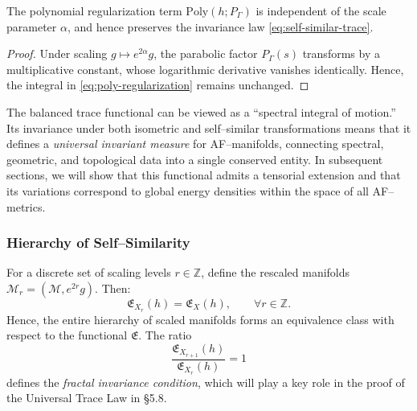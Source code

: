 \begin{lemma}
\label{lem:regularization}
The polynomial regularization term
\(\mathrm{Poly}(h;P_\Gamma)\)
is independent of the scale parameter \(\alpha\),
and hence preserves the invariance law \eqref{eq:self-similar-trace}.
\end{lemma}

\begin{proof}
Under scaling \(g \mapsto e^{2\alpha} g\),
the parabolic factor \(P_\Gamma(s)\)
transforms by a multiplicative constant,
whose logarithmic derivative vanishes identically.
Hence, the integral in \eqref{eq:poly-regularization}
remains unchanged.
\end{proof}


\begin{remark}
The balanced trace functional can be viewed as a “spectral integral of motion.”
Its invariance under both isometric and self–similar transformations
means that it defines a \emph{universal invariant measure}
for AF–manifolds, connecting spectral, geometric,
and topological data into a single conserved entity.
In subsequent sections,
we will show that this functional
admits a tensorial extension
and that its variations correspond to global energy densities
within the space of all AF–metrics.
\end{remark}


\subsubsection*{Hierarchy of Self–Similarity}
For a discrete set of scaling levels \(r\in \mathbb{Z}\),
define the rescaled manifolds \(\mathcal{M}_r = (\mathcal{M}, e^{2r}g)\).
Then:
\begin{equation}
\label{eq:hierarchy-invariance}
\mathfrak{E}_{X_r}(h)
=
\mathfrak{E}_X(h),
\qquad
\forall r\in \mathbb{Z}.
\end{equation}
Hence, the entire hierarchy of scaled manifolds
forms an equivalence class with respect to the functional \(\mathfrak{E}\).
The ratio
\[
\frac{\mathfrak{E}_{X_{r+1}}(h)}{\mathfrak{E}_{X_r}(h)} = 1
\]
defines the \emph{fractal invariance condition},
which will play a key role in the proof
of the Universal Trace Law in \S5.8.

